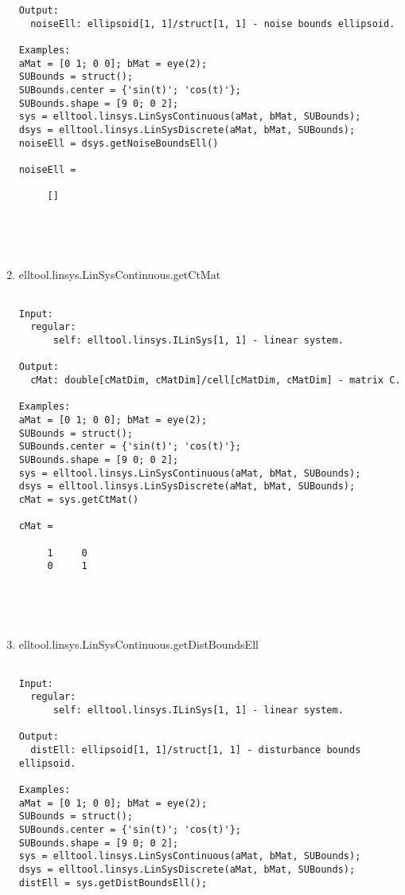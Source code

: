 \begin{enumerate}
\begin{lstlisting}
Output:
  noiseEll: ellipsoid[1, 1]/struct[1, 1] - noise bounds ellipsoid.

Examples:
aMat = [0 1; 0 0]; bMat = eye(2);
SUBounds = struct();
SUBounds.center = {'sin(t)'; 'cos(t)'};
SUBounds.shape = [9 0; 0 2];
sys = elltool.linsys.LinSysContinuous(aMat, bMat, SUBounds);
dsys = elltool.linsys.LinSysDiscrete(aMat, bMat, SUBounds);
noiseEll = dsys.getNoiseBoundsEll()

noiseEll =

     []





\end{lstlisting}
\fontfamily{\familydefault}
\selectfont
\item {elltool.linsys.LinSysContinuous.getCtMat}
\selectfont
\begin{lstlisting}

Input:
  regular:
      self: elltool.linsys.ILinSys[1, 1] - linear system.

Output:
  cMat: double[cMatDim, cMatDim]/cell[cMatDim, cMatDim] - matrix C.

Examples:
aMat = [0 1; 0 0]; bMat = eye(2);
SUBounds = struct();
SUBounds.center = {'sin(t)'; 'cos(t)'};
SUBounds.shape = [9 0; 0 2];
sys = elltool.linsys.LinSysContinuous(aMat, bMat, SUBounds);
dsys = elltool.linsys.LinSysDiscrete(aMat, bMat, SUBounds);
cMat = sys.getCtMat()

cMat =

     1     0
     0     1





\end{lstlisting}
\fontfamily{\familydefault}
\selectfont
\item {elltool.linsys.LinSysContinuous.getDistBoundsEll}
\selectfont
\begin{lstlisting}

Input:
  regular:
      self: elltool.linsys.ILinSys[1, 1] - linear system.

Output:
  distEll: ellipsoid[1, 1]/struct[1, 1] - disturbance bounds ellipsoid.

Examples:
aMat = [0 1; 0 0]; bMat = eye(2);
SUBounds = struct();
SUBounds.center = {'sin(t)'; 'cos(t)'};
SUBounds.shape = [9 0; 0 2];
sys = elltool.linsys.LinSysContinuous(aMat, bMat, SUBounds);
dsys = elltool.linsys.LinSysDiscrete(aMat, bMat, SUBounds);
distEll = sys.getDistBoundsEll();






\end{lstlisting}
\end{enumerate}
